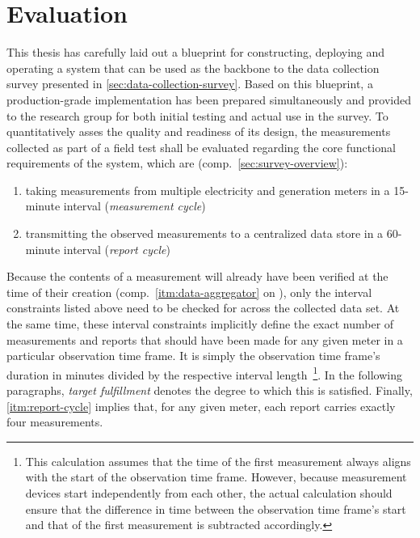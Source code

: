 
\chapter{Evaluation}
\label{chp:conclusion}

This thesis has carefully laid out a blueprint for constructing, deploying and operating a system that can be used as the backbone to the data collection survey presented in \autoref{sec:data-collection-survey}. Based on this blueprint, a production-grade implementation has been prepared simultaneously and provided to the research group for both initial testing and actual use in the survey. To quantitatively asses the quality and readiness of its design, the measurements collected as part of a field test shall be evaluated regarding the core functional requirements of the system, which are (comp.~\autoref{sec:survey-overview}):

\begin{enumerate}[label=(\Alph*)]
  \item taking measurements from multiple electricity and generation meters in a 15-minute interval (\textit{measurement cycle}) \label{itm:measurement-cycle}
  \item transmitting the observed measurements to a centralized data store in a \mbox{60-minute} interval (\textit{report cycle}) \label{itm:report-cycle}
\end{enumerate}

Because the contents of a measurement will already have been verified at the time of their creation (comp.~\ref{itm:data-aggregator} on ), only the interval constraints listed above need to be checked for across the collected data set. At the same time, these interval constraints implicitly define the exact number of measurements and reports that should have been made for any given meter in a particular observation time frame. It is simply the observation time frame's duration in minutes divided by the respective interval length~\footnote{This calculation assumes that the time of the first measurement always aligns with the start of the observation time frame. However, because measurement devices start independently from each other, the actual calculation should ensure that the difference in time between the observation time frame's start and that of the first measurement is subtracted accordingly.}. In the following paragraphs, \textit{target fulfillment} denotes the degree to which this is satisfied. Finally, \ref{itm:report-cycle} implies that, for any given meter, each report carries exactly four measurements.

